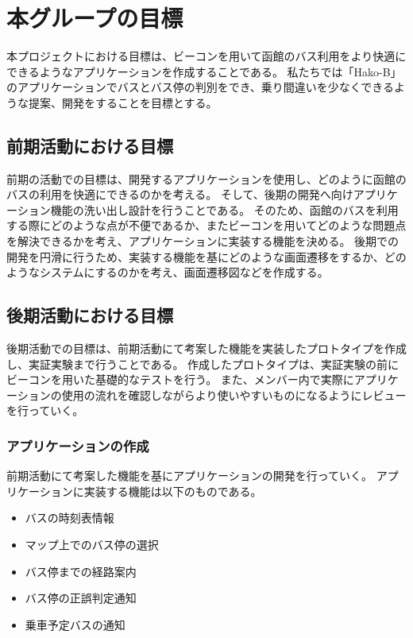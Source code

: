 \documentclass[openany,11pt,papersize]{jsbook}
\begin{document}
\section{本グループの目標}
本プロジェクトにおける目標は、ビーコンを用いて函館のバス利用をより快適にできるようなアプリケーションを作成することである。
私たちでは「Hako-B」のアプリケーションでバスとバス停の判別をでき、乗り間違いを少なくできるような提案、開発をすることを目標とする。


\subsection{前期活動における目標}
前期の活動での目標は、開発するアプリケーションを使用し、どのように函館のバスの利用を快適にできるのかを考える。
そして、後期の開発へ向けアプリケーション機能の洗い出し設計を行うことである。
そのため、函館のバスを利用する際にどのような点が不便であるか、またビーコンを用いてどのような問題点を解決できるかを考え、アプリケーションに実装する機能を決める。
後期での開発を円滑に行うため、実装する機能を基にどのような画面遷移をするか、どのようなシステムにするのかを考え、画面遷移図などを作成する。


\subsection{後期活動における目標}
後期活動での目標は、前期活動にて考案した機能を実装したプロトタイプを作成し、実証実験まで行うことである。
作成したプロトタイプは、実証実験の前にビーコンを用いた基礎的なテストを行う。
また、メンバー内で実際にアプリケーションの使用の流れを確認しながらより使いやすいものになるようにレビューを行っていく。


\subsubsection{アプリケーションの作成}
前期活動にて考案した機能を基にアプリケーションの開発を行っていく。
アプリケーションに実装する機能は以下のものである。
\begin{itemize}

\item バスの時刻表情報
\item マップ上でのバス停の選択
\item バス停までの経路案内
\item バス停の正誤判定通知
\item 乗車予定バスの通知

\end{itemize}
\end{document}
